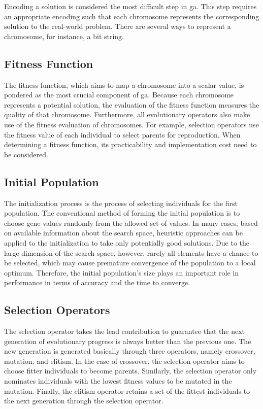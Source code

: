 Encoding a solution is considered the most difficult step in \gls{ga}. This step requires an appropriate encoding such that each chromosome represents the corresponding solution to the real-world problem. There are several ways to represent a chromosome, for instance, a bit string.

\subsection {Fitness Function}
\label{ga:fitness}
The fitness function, which aims to map a chromosome into a scalar value, is pondered as the most crucial component of \gls{ga}. Because each chromosome represents a potential solution, the evaluation of the fitness function measures the quality of that chromosome. Furthermore, all evolutionary operators also make use of the fitness evaluation of chromosomes. For example, selection operators use the fitness value of each individual to select parents for reproduction. When determining a fitness function, its practicability and implementation cost need to be considered.

\subsection {Initial Population}
\label{ga:init}
The initialization process is the process of selecting individuals for the first population. The conventional method of forming the initial population is to choose gene values randomly from the allowed set of values. In many cases, based on available information about the search space, heuristic approaches can be applied to the initialization to take only potentially good solutions. Due to the large dimension of the search space, however, rarely all elements have a chance to be selected, which may cause premature convergence of the population to a local optimum. Therefore, the initial population's size plays an important role in performance in terms of accuracy and the time to converge.

\subsection {Selection Operators}
\label{ga:selection}
The selection operator takes the lead contribution to guarantee that the next generation of evolutionary progress is always better than the previous one. The new generation is generated basically through three operators, namely crossover, mutation, and elitism. In the case of crossover, the selection operator aims to choose fitter individuals to become parents. Similarly, the selection operator only nominates individuals with the lowest fitness values to be mutated in the mutation. Finally, the elitism operator retains a set of the fittest individuals to the next generation through the selection operator. 

